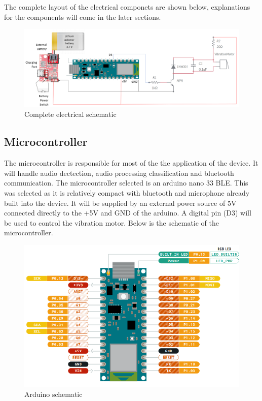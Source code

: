 \documentclass[12pt, titlepage]{article}
\begin{document}
The complete layout of the electrical componets are shown below, explanations for the components will come in the later sections.
\begin{figure}[H]
\centering
  \includegraphics[width=\textwidth,height=\textheight,keepaspectratio]{Schematic.png}
  \caption{Complete electrical schematic}
  \label{schematic} 
\end{figure}

\subsection{Microcontroller}
The microcontroller is responsible for most of the the application of the device. It will handle audio dectection, audio processing classification and bluetooth communication. The microcontroller selected is an arduino nano 33 BLE. This was selected as it is relatively compact with bluetooth and microphone already built into the device. It will be supplied by an external power source of 5V connected directly to the +5V and GND of the arduino. A digital pin (D3) will be used to control the vibration motor. Below is the schematic of the microcontroller.
 \begin{figure}[H]
\centering
  \includegraphics[width=\textwidth,height=\textheight,keepaspectratio]{NanoSchematic.png}
  \caption{Arduino schematic}
  \label{Nanoschematic} 
\end{figure}
\end{document}
